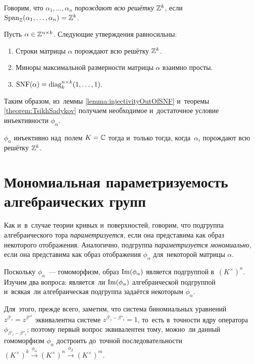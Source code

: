 \documentclass{article}
\begin{document}
Говорим, что $\alpha_1, \ldots, \alpha_n$ \textit{порождают всю решётку} $\mathbb{Z}^k$, если $\mathrm{Span}_{\mathbb{Z}}(\alpha_1, \ldots, \alpha_n) = \mathbb{Z}^k$.

\begin{theorem}
\label{theorem:TsikhSadykov}
    Пусть $\alpha \in \mathbb{Z}^{n \times k}$. Следующие утверждения равносильны:
    \begin{enumerate}
        \item Строки матрицы $\alpha$ порождают всю решётку $\mathbb{Z}^k$.
        \item Миноры максимальной размерности матрицы $\alpha$ взаимно просты.
        \item $\mathrm{SNF}(\alpha) = \mathrm{diag}^{n \times k}_k(1, \ldots, 1)$.
    \end{enumerate}
\end{theorem}

Таким образом, из~леммы \ref{lemma:injectivityOutOfSNF} и~теоремы \ref{theorem:TsikhSadykov}
получаем необходимое и~достаточное условие инъективности $\phi_\alpha$.

\begin{theorem*}
    $\phi_\alpha$ инъективно над~полем $K = \mathbb{C}$ тогда и~только тогда, когда~$\alpha_i$ порождают всю решётку $\mathbb{Z}^k$.
\end{theorem*}

\section{Мономиальная параметризуемость алгебраических групп}

Как и~в~случае теории кривых и~поверхностей, говорим, что подгруппа алгебраического тора \textit{параметризуется,}
если она представима как образ некоторого отображения. Аналогично, подгруппа \textit{параметризуется мономиально,}
если она представима как образ отображения $\phi_\alpha$ для~некоторой матрицы $\alpha$.

Поскольку $\phi_\alpha$~— гомоморфизм, образ $\mathrm{Im}(\phi_\alpha)$ является подгруппой в~$(K^\times)^n$.
Изучим два вопроса: является~ли $\mathrm{Im}(\phi_\alpha)$ алгебраической подгруппой и~всякая~ли алгебраическая подгруппа задаётся некоторым $\phi_\alpha$.

Для~этого, прежде всего, заметим, что система биномиальных уравнений $z^{\beta'_i} = z^{\beta''^i}$ эквивалентна
системе $z^{\beta'_i - \beta''_i} = 1$, то~есть в~точности ядру оператора $\phi_{\beta'_i - \beta''_i}$;
поэтому первый вопрос эквивалентен тому, можно~ли данный гомоморфизм $\phi_\alpha$ достроить
до~точной последовательности $(K^\times)^k \xrightarrow[]{\phi_\alpha} (K^\times)^n \xrightarrow[]{\phi_\beta} (K^\times)^m$.
\end{document}

